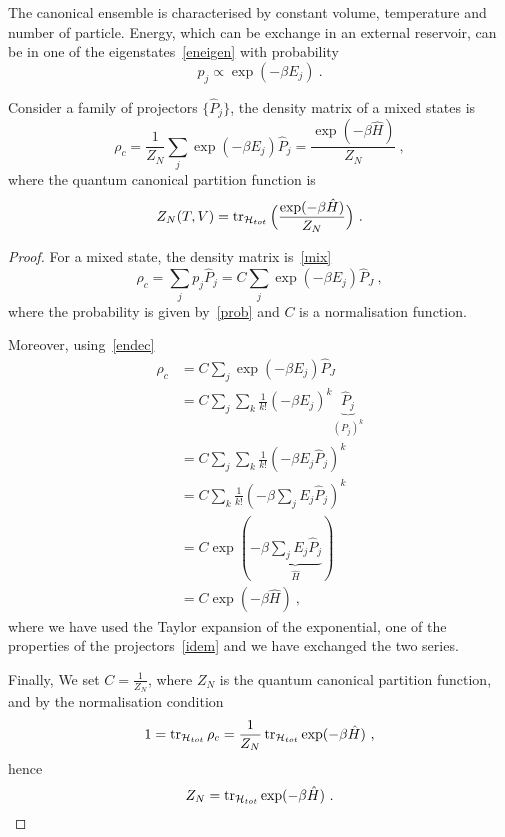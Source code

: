     The canonical ensemble is characterised by constant volume, temperature and number of particle. Energy, which can be exchange in an external reservoir, can be in one of the eigenstates~\eqref{eneigen} with probability 
    \begin{equation}\label{prob}
        p_j \propto \exp(- \beta E_j) ~.
    \end{equation}

    Consider a family of projectors $\{\hat P_j\}$, the density matrix of a mixed states is 
    \begin{equation*}
        \rho_c = \frac{1}{Z_N } \sum_j \exp(- \beta E_j) \hat P_j = \frac{\exp(- \beta \hat H)}{Z_N} ~,
    \end{equation*}
    where the quantum canonical partition function is 
    \begin{equation*}
        Z_N(T,V) = \operatorname{tr}_{\mathcal H_{tot}} \Big ( \frac{\exp(- \beta \hat H)}{Z_N} \Big) ~.
    \end{equation*}
    \begin{proof}
        For a mixed state, the density matrix is~\eqref{mix}
        \begin{equation*}
            \rho_c = \sum_j p_j \hat P_j = C \sum_j \exp(- \beta E_j) \hat P_J ~,
        \end{equation*}
        where the probability is given by~\eqref{prob} and $C$ is a normalisation function.

        Moreover, using~\eqref{endec}
        \begin{equation*}
        \begin{aligned}
            \rho_c & = C \sum_j \exp(- \beta E_j) \hat P_J \\ & = C \sum_j \sum_k \frac{1}{k!} (-\beta E_j)^k \underbrace{\hat P_j}_{(P_j)^k} \\ & = C \sum_j \sum_k \frac{1}{k!} (-\beta E_j \hat P_j)^k \\ & = C \sum_k \frac{1}{k!} (-\beta \sum_j E_j \hat P_j)^k \\ & = C \exp(- \beta \underbrace{\sum_j E_j \hat P_j}_{\hat H}) \\ & = C \exp(- \beta \hat H) ~,
        \end{aligned}
        \end{equation*}
        where we have used the Taylor expansion of the exponential, one of the properties of the projectors~\eqref{idem} and we have exchanged the two series.

        Finally, We set $C = \frac{1}{Z_N}$, where $Z_N$ is the quantum canonical partition function, and by the normalisation condition 
        \begin{equation*}
            1 = \operatorname{tr}_{\mathcal H_{tot}} \rho_c = \frac{1}{Z_N} \operatorname{tr}_{\mathcal H_{tot}} \exp(- \beta \hat H) ~,
        \end{equation*}
        hence 
        \begin{equation*}
            Z_N = \operatorname{tr}_{\mathcal H_{tot}} \exp(- \beta \hat H) ~.
        \end{equation*}
    \end{proof}

